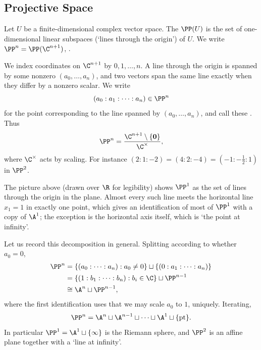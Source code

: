 \subsection{Projective Space}

\begin{definition}[Projectivisation]
	Let $U$ be a finite-dimensional complex vector space. The  $\PP(U)$ is the set of one-dimensional linear subspaces (`lines through the origin') of $U$. We write $\PP^n = \PP(\C^{n+1})$, .
\end{definition}

We index coordinates on $\C^{n+1}$ by $0,1,\dots,n$. A line through the origin is spanned by some nonzero $(a_0,\dots,a_n)$, and two vectors span the same line exactly when they differ by a nonzero scalar. We write
$$(a_0 : a_1 : \cdots : a_n) \in \PP^n$$
for the point corresponding to the line spanned by $(a_0,\dots,a_n)$, and call these . Thus
$$\PP^n = \frac{\C^{n+1}\setminus\{\mathbf{0}\}}{\C^\times},$$
where $\C^\times$ acts by scaling. For instance $(2:1:-2) = (4:2:-4) = (-1:-\tfrac12:1)$ in $\PP^2$.

\begin{center}
\end{center}

The picture above (drawn over $\R$ for legibility) shows $\PP^1$ as the set of lines through the origin in the plane. Almost every such line meets the horizontal line $x_1 = 1$ in exactly one point, which gives an identification of most of $\PP^1$ with a copy of $\A^1$; the exception is the horizontal axis itself, which is `the point at infinity'.

Let us record this decomposition in general. Splitting according to whether $a_0 = 0$,
\begin{align*}
	\PP^n &= \{(a_0 : \cdots : a_n) : a_0 \neq 0\} \sqcup \{(0 : a_1 : \cdots : a_n)\}\\
	&= \{(1 : b_1 : \cdots : b_n) : b_i \in \C\} \sqcup \PP^{n-1}\\
	&\cong \A^n \sqcup \PP^{n-1},
\end{align*}
where the first identification uses that we may scale $a_0$ to $1$, uniquely. Iterating,
$$\PP^n = \A^n \sqcup \A^{n-1} \sqcup \cdots \sqcup \A^1 \sqcup \{\text{pt}\}.$$
In particular $\PP^1 = \A^1 \sqcup \{\infty\}$ is the Riemann sphere, and $\PP^2$ is an affine plane together with a `line at infinity'.

